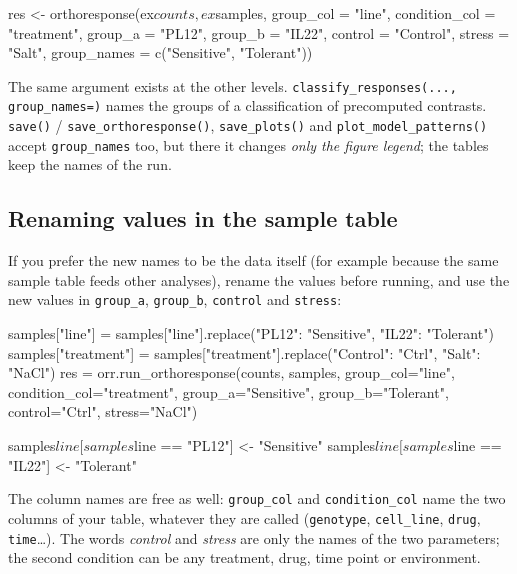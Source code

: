 \documentclass[11pt,a4paper]{article}
\newcommand{\code}[1]{\texttt{\color{navy!85!black}#1}}
\begin{document}
\begin{rcode}
res <- orthoresponse(ex$counts, ex$samples,
                     group_col = "line", condition_col = "treatment",
                     group_a = "PL12", group_b = "IL22",
                     control = "Control", stress = "Salt",
                     group_names = c("Sensitive", "Tolerant"))
\end{rcode}


The same argument exists at the other levels. \code{classify\_responses(..., group\_names=)} names the
groups of a classification of precomputed contrasts. \code{save()} / \code{save\_orthoresponse()},
\code{save\_plots()} and \code{plot\_model\_patterns()} accept \code{group\_names} too, but there it
changes \emph{only the figure legend}; the tables keep the names of the run.

\subsection{Renaming values in the sample table}

If you prefer the new names to be the data itself (for example because the same sample table feeds
other analyses), rename the values before running, and use the new values in \code{group\_a},
\code{group\_b}, \code{control} and \code{stress}:

\begin{pycode}
samples["line"] = samples["line"].replace({"PL12": "Sensitive", "IL22": "Tolerant"})
samples["treatment"] = samples["treatment"].replace({"Control": "Ctrl", "Salt": "NaCl"})
res = orr.run_orthoresponse(counts, samples,
                            group_col="line", condition_col="treatment",
                            group_a="Sensitive", group_b="Tolerant",
                            control="Ctrl", stress="NaCl")
\end{pycode}

\begin{rcode}
samples$line[samples$line == "PL12"] <- "Sensitive"
samples$line[samples$line == "IL22"] <- "Tolerant"
\end{rcode}

The column names are free as well: \code{group\_col} and \code{condition\_col} name the two columns
of your table, whatever they are called (\code{genotype}, \code{cell\_line}, \code{drug},
\code{time}\ldots). The words \emph{control} and \emph{stress} are only the names of the two
parameters; the second condition can be any treatment, drug, time point or environment.
\end{document}
